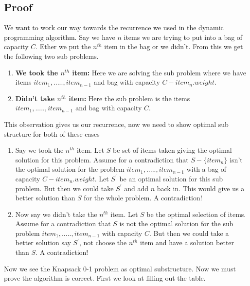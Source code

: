 \documentclass{article}
\begin{document}
		\subsection{Proof}
			We want to work our way towards the recurrence we used in the dynamic programming algorithm. Say we have $n$ items we are trying to put into a bag of capacity $C$. Ether we put the $n^{th}$ item in the bag or we didn't. From this we get the following two sub problems.
			
			\begin{enumerate}
				\item \textbf{We took the $n^{th}$ item:} Here we are solving the sub problem where we have items $item_1,.....,item_{n-1}$ and bag with capacity $C - item_n.weight$.
				
				\item \textbf{Didn't take $n^{th}$ item:} Here the sub problem is the items $item_1,.....,item_{n-1}$ and bag with capacity $C$.
			\end{enumerate}
			
			This observation gives us our recurrence, now we need to show optimal sub structure for both of these cases
			
			\begin{enumerate}
				\item Say we took the $n^{th}$ item. Let $S$ be set of items taken giving the optimal solution for this problem. Assume for a contradiction that $S - \{item_n\}$ isn't the optimal solution for the problem $item_1,.....,item_{n-1}$ with a bag of capacity $C - item_n.weight$. Let $S^\prime$ be an optimal solution for this sub problem. But then we could take $S^\prime$ and add $n$ back in. This would give us a better solution than $S$ for the whole problem. A contradiction!
				
				\item Now say we didn't take the $n^{th}$ item. Let $S$ be the optimal selection of items. Assume for a contradiction that $S$ is not the optimal solution for the sub problem $item_1,.....,item_{n-1}$ with capacity $C$. But then we could take a better solution say $S^\prime$, not choose the $n^{th}$ item and have a solution better than $S$. A contradiction!
			\end{enumerate}								
		
		Now we see the Knapsack 0-1 problem as optimal substructure. Now we must prove the algorithm is correct. First we look at filling out the table.\newline
		
\end{document}
